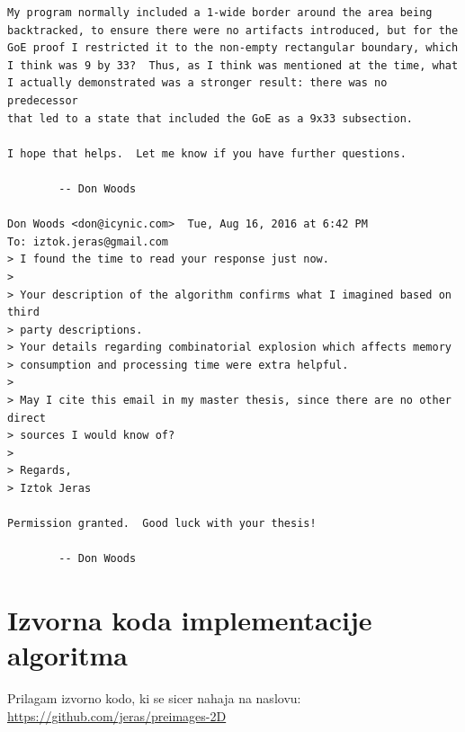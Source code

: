 \documentclass[12pt,a4paper,openany,twoside]{book}
\begin{document}
\begin{Verbatim}[fontsize=\small]
My program normally included a 1-wide border around the area being
backtracked, to ensure there were no artifacts introduced, but for the
GoE proof I restricted it to the non-empty rectangular boundary, which
I think was 9 by 33?  Thus, as I think was mentioned at the time, what
I actually demonstrated was a stronger result: there was no predecessor
that led to a state that included the GoE as a 9x33 subsection.

I hope that helps.  Let me know if you have further questions.

        -- Don Woods

Don Woods <don@icynic.com>	Tue, Aug 16, 2016 at 6:42 PM
To: iztok.jeras@gmail.com
> I found the time to read your response just now.
>
> Your description of the algorithm confirms what I imagined based on third
> party descriptions.
> Your details regarding combinatorial explosion which affects memory
> consumption and processing time were extra helpful.
>
> May I cite this email in my master thesis, since there are no other direct
> sources I would know of?
>
> Regards,
> Iztok Jeras

Permission granted.  Good luck with your thesis!

        -- Don Woods
\end{Verbatim}


\chapter{Izvorna koda implementacije algoritma}
\label{koda}

Prilagam izvorno kodo, ki se sicer nahaja na naslovu:\\
\url{https://github.com/jeras/preimages-2D}
\end{document}
